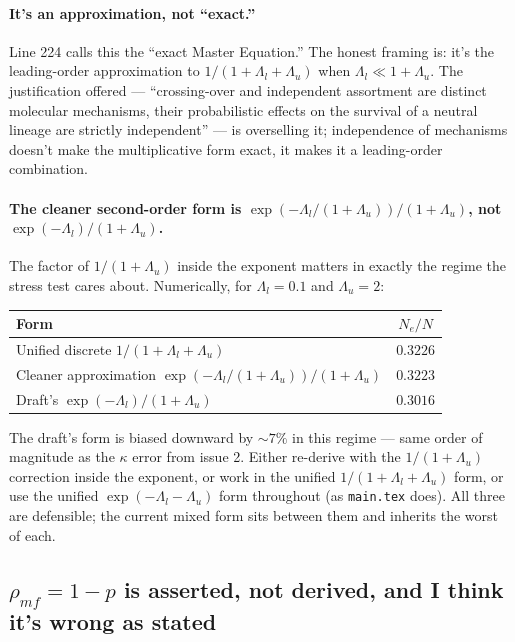 \documentclass[11pt]{article}
\begin{document}
\paragraph{It's an approximation, not ``exact.''} Line 224 calls this
the ``exact Master Equation.'' The honest framing is: it's the
leading-order approximation to $1/(1+\Lambda_l+\Lambda_u)$ when
$\Lambda_l \ll 1+\Lambda_u$. The justification offered ---
``crossing-over and independent assortment are distinct molecular
mechanisms, their probabilistic effects on the survival of a neutral
lineage are strictly independent'' --- is overselling it; independence
of mechanisms doesn't make the multiplicative form exact, it makes it
a leading-order combination.

\paragraph{The cleaner second-order form is $\exp(-\Lambda_l/(1+\Lambda_u))/(1+\Lambda_u)$, not $\exp(-\Lambda_l)/(1+\Lambda_u)$.}
The factor of $1/(1+\Lambda_u)$ inside the exponent matters in exactly
the regime the stress test cares about. Numerically, for
$\Lambda_l = 0.1$ and $\Lambda_u = 2$:

\begin{center}
\begin{tabular}{lc}
\toprule
Form & $N_e/N$\\
\midrule
Unified discrete $1/(1+\Lambda_l+\Lambda_u)$ & $0.3226$\\
Cleaner approximation $\exp(-\Lambda_l/(1+\Lambda_u))/(1+\Lambda_u)$ & $0.3223$\\
Draft's $\exp(-\Lambda_l)/(1+\Lambda_u)$ & $0.3016$\\
\bottomrule
\end{tabular}
\end{center}

The draft's form is biased downward by $\sim 7\%$ in this regime ---
same order of magnitude as the $\kappa$ error from issue 2. Either
re-derive with the $1/(1+\Lambda_u)$ correction inside the exponent,
or work in the unified $1/(1+\Lambda_l+\Lambda_u)$ form, or use the
unified $\exp(-\Lambda_l-\Lambda_u)$ form throughout (as
\texttt{main.tex} does). All three are defensible; the current mixed
form sits between them and inherits the worst of each.

\subsection{$\rho_{mf} = 1-p$ is asserted, not derived, and I think it's wrong as stated}
\end{document}
